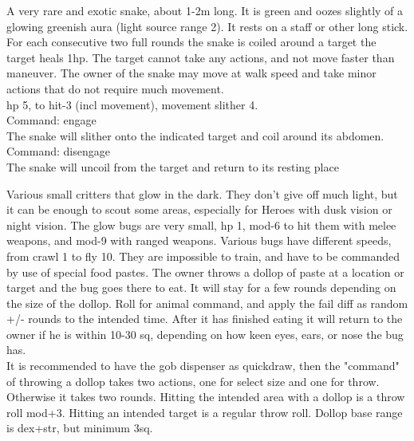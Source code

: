 A very rare and exotic snake, about 1-2m long. It is green and oozes slightly of a glowing greenish aura (light source range 2). It rests on a staff or other long stick. For each consecutive two full rounds the snake is coiled around a target the target heals 1hp. The target cannot take any actions, and not move faster than maneuver. The owner of the snake may move at walk speed and take minor actions that do not require much movement. \\
hp 5, to hit-3 (incl movement), movement slither 4. \\
Command: engage \\
The snake will slither onto the indicated target and coil around its abdomen.
Command: disengage \\
The snake will uncoil from the target and return to its resting place


Various small critters that glow in the dark. They don't give off much light, but it can be enough to scout some areas, especially for Heroes with dusk vision or night vision. The glow bugs are very small, hp 1, mod-6 to hit them with melee weapons, and mod-9 with ranged weapons. Various bugs have different speeds, from crawl 1 to fly 10. They are impossible to train, and have to be commanded by use of special food pastes. The owner throws a dollop of paste at a location or target and the bug goes there to eat. It will stay for a few rounds depending on the size of the dollop. Roll for animal command, and apply the fail diff as random +/- rounds to the intended time. After it has finished eating it will return to the owner if he is within 10-30 sq, depending on how keen eyes, ears, or nose the bug has. \\
It is recommended to have the gob dispenser as quickdraw, then the "command" of throwing a dollop takes two actions, one for select size and one for throw. Otherwise it takes two rounds. Hitting the intended area with a dollop is a throw roll mod+3. Hitting an intended target is a regular throw roll. Dollop base range is dex+str, but minimum 3sq.


